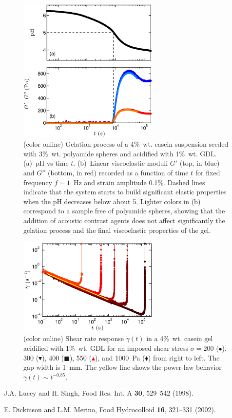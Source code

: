 \documentclass[twocolumn,superscriptaddress,showpacs,preprintnumbers,amsmath,amssymb,prl]{revtex4}
\newcommand\gp{\dot\gamma}
\begin{document}
\begin{figure}[th]
\centering
\includegraphics[width=7cm,clip]{SuppFig1.eps}
\caption{(color online) Gelation process of a 4\%~wt. casein suspension seeded with 3\%~wt. polyamide spheres and acidified with 1\%~wt. GDL. (a)~pH vs time $t$. (b)~Linear viscoelastic moduli $G'$ (top, in blue) and $G''$ (bottom, in red) recorded as a function of time $t$ for fixed frequency $f=1$~Hz and strain amplitude 0.1\%. Dashed lines indicate that the system starts to build significant elastic properties when the pH decreases below about 5. Lighter colors in (b) correspond to a sample free of polyamide spheres, showing that the addition of acoustic contrast agents does not affect significantly the gelation process and the final viscoelastic properties of the gel.
\label{suppfig1}}
\end{figure} 

\begin{figure}[h]
\centering
\includegraphics[width=7cm,clip]{SuppFig2.eps}
\caption{(color online) Shear rate response $\gp(t)$ in a 4\%~wt. casein gel acidified with 1\%~wt. GDL for an imposed shear stress $\sigma=200$ (\textcolor{red!25!black}{$\bullet$}), 300 (\textcolor{red!50!black}{$\blacktriangledown$}), 400 (\textcolor{red!75!black}{$\blacksquare$}), 550 (\textcolor{red}{$\blacktriangle$}), and 1000~Pa (\textcolor{orange!50!red}{$\blacklozenge$}) from right to left. The gap width is 1~mm. The yellow line shows the power-law behavior $\gp(t)\sim t^{-0.85}$.
\label{suppfig2}}
\end{figure} 

\begin{thebibliography}{}

 J.A. Lucey and H. Singh, Food Res. Int. A {\bf 30}, 529--542 (1998).

 E. Dickinson and L.M. Merino, Food Hydrocolloid {\bf 16}, 321--331 (2002).

\end{thebibliography}
\end{document}
